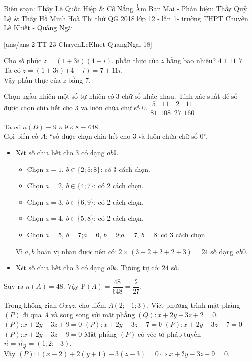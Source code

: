 \begin{name}
{Biên soạn: Thầy Lê Quốc Hiệp \& Cô Nắng Ấm Ban Mai - Phản biện: Thầy Quỷ Lệ \&  Thầy Hồ Minh Hoà}
{Thi thử QG 2018 lớp 12 - lần 1- trường THPT Chuyên Lê Khiết - Quảng Ngãi}
\end{name}
\setcounter{ex}{0}\setcounter{bt}{0}
[ans/ans-2-TT-23-ChuyenLeKhiet-QuangNgai-18]
\begin{ex}%
	Cho số phức $z=(1+3i)(4-i)$, phần thực của $z$ bằng bao nhiêu?
	\choice
	{$4$}
	{$1$}
	{$11$}
	{\True $7$}
	\loigiai
	{
		Ta có $z=(1+3i)(4-i)=7+11i$.\\ Vậy phần thực của $z$ bằng $7$.
	}
\end{ex}

\begin{ex}%
	Chọn ngẫu nhiên một số tự nhiên có $3$ chữ số khác nhau. Tính xác suất để số được chọn chia hết cho $3$ và luôn chứa chữ số $0$.
	\choice
	{$\dfrac{5}{81}$}
	{$\dfrac{11}{108}$}
	{\True $\dfrac{2}{27}$}
	{$\dfrac{11}{160}$}
	\loigiai
	{
		Ta có $n(\Omega)=9\times9\times8=648$.\\
		Gọi biến cố $A$: ``số được chọn chia hết cho $3$ và luôn chứa chữ số $0$''.
		\begin{itemize}
			\item Xét số chia hết cho $3$ có dạng $\overline{ab0}$.
			 \begin{itemize}
			 	\item Chọn $a=1$, $b\in \{2;5;8\}$: có 3 cách chọn.
			 	\item Chọn $a=2$, $b\in \{4;7\}$: có 2 cách chọn.
			 	\item Chọn $a=3$, $b\in \{6;9\}$: có 2 cách chọn.
			 	\item Chọn $a=4$, $b\in \{5;8\}$: có 2 cách chọn.
			 	\item Chọn $a=5$, $b=7$;$a=6$, $b=9$;$a=7$, $b=8$: có 3 cách chọn.
			 \end{itemize}Vì $a,b$ hoán vị nhau được nên có: $2\times(3+2+2+2+3)=24$ số dạng $\overline{ab0}$.
			\item Xét số chia hết cho $3$ có dạng $\overline{a0b}$. Tương tự có: $24$ số.
		\end{itemize}
	Suy ra $n(A)=48$. Vậy $\mathrm{P}(A)=\dfrac{48}{648}=\dfrac{2}{27}$.
	}
\end{ex}

\begin{ex}%
	Trong không gian $Oxyz$, cho điểm $A(2;-1;3)$. Viết phương trình mặt phẳng $(P)$ đi qua $A$ và song song với mặt phẳng $(Q):x+2y-3z+2=0$.
	\choice
	{\True $(P):x+2y-3z+9=0$}
	{$(P):x+2y-3z-7=0$}
	{$(P):x+2y-3z+7=0$}
	{$(P):x+2y-3z-9=0$}
	\loigiai
	{
		Mặt phẳng $(P)$ có véc-tơ pháp tuyến $\vec{n}=\vec{n}_Q=(1;2;-3)$.\\
		Vậy $(P):1(x-2)+2(y+1)-3(z-3)=0 \Leftrightarrow  x+2y-3z+9=0$.
	}
\end{ex}

